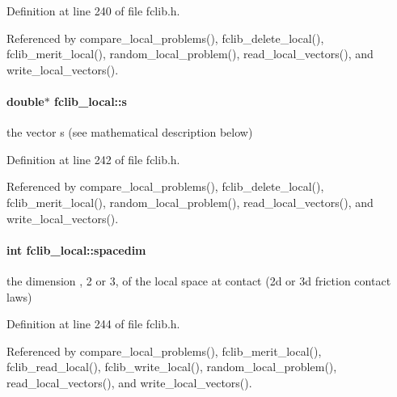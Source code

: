Definition at line 240 of file fclib.\+h.



Referenced by compare\+\_\+local\+\_\+problems(), fclib\+\_\+delete\+\_\+local(), fclib\+\_\+merit\+\_\+local(), random\+\_\+local\+\_\+problem(), read\+\_\+local\+\_\+vectors(), and write\+\_\+local\+\_\+vectors().

\hypertarget{structfclib__local_abb6b3a07d92a86aac1c38e4d847207e3}{}
\paragraph[{s}]{\setlength{\rightskip}{0pt plus 5cm}double$\ast$ fclib\+\_\+local\+::s}\label{structfclib__local_abb6b3a07d92a86aac1c38e4d847207e3}


the vector s (see mathematical description below) 



Definition at line 242 of file fclib.\+h.



Referenced by compare\+\_\+local\+\_\+problems(), fclib\+\_\+delete\+\_\+local(), fclib\+\_\+merit\+\_\+local(), random\+\_\+local\+\_\+problem(), read\+\_\+local\+\_\+vectors(), and write\+\_\+local\+\_\+vectors().

\hypertarget{structfclib__local_accf07018913652e57be3a661b25d8bb7}{}
\paragraph[{spacedim}]{\setlength{\rightskip}{0pt plus 5cm}int fclib\+\_\+local\+::spacedim}\label{structfclib__local_accf07018913652e57be3a661b25d8bb7}


the dimension , 2 or 3, of the local space at contact (2d or 3d friction contact laws) 



Definition at line 244 of file fclib.\+h.



Referenced by compare\+\_\+local\+\_\+problems(), fclib\+\_\+merit\+\_\+local(), fclib\+\_\+read\+\_\+local(), fclib\+\_\+write\+\_\+local(), random\+\_\+local\+\_\+problem(), read\+\_\+local\+\_\+vectors(), and write\+\_\+local\+\_\+vectors().

\hypertarget{structfclib__local_ababce9da71cdb99e4928a596dde8bc89}{}
